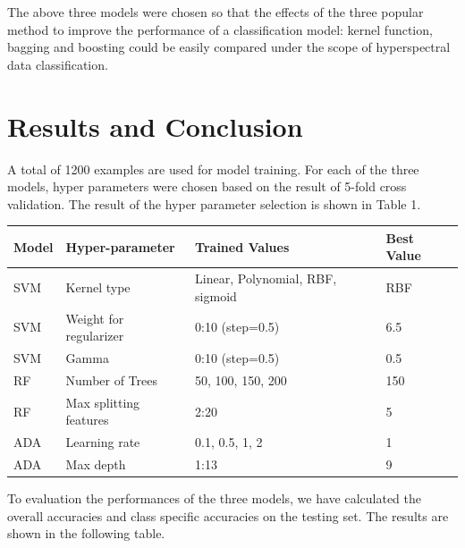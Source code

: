 \documentclass[11pt]{article}
\begin{document}
   The above three models were chosen so that the effects of the three popular method to improve the performance of a classification model: kernel function, bagging and boosting could be easily compared under the scope of hyperspectral data classification.
 
 
\section{Results and Conclusion}
A total of 1200 examples are used for model training. For each of the three models, hyper parameters were chosen based on the result of 5-fold cross validation. The result of the hyper parameter selection is shown in Table 1.
\begin{center}
	\begin{tabular}{|l|l|l|l|}
		\hline
		Model	&	Hyper-parameter	&	Trained Values	&	Best Value	\\ \hline
		SVM		&	Kernel type		&	Linear, Polynomial, RBF, sigmoid	& RBF \\
		SVM		&	Weight for regularizer &	0:10 (step=0.5)	&	6.5	\\
		SVM		&	Gamma			&	0:10 (step=0.5)			&	0.5 \\
		RF		&	Number of Trees &	50, 100, 150, 200	&	150		\\ 
		RF		&	Max splitting features & 2:20		&	5			\\
		ADA		&	Learning rate	&	0.1, 0.5, 1, 2	&	1			\\
		ADA		& 	Max depth		&	1:13			&	9			\\
		\hline
	\end{tabular}
\end{center}


To evaluation the performances of the three models, we have calculated the overall accuracies and class specific accuracies on the testing set. The results are shown in the following table.
\end{document}
